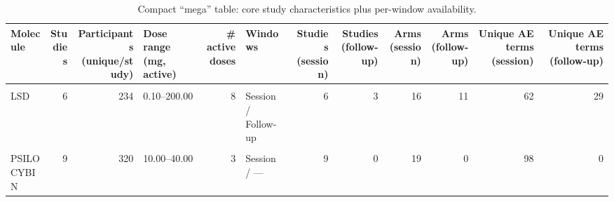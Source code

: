 \begin{table}[!h]
\centering
\caption{\label{tab:tab:mega_study_profile}Compact “mega” table: core study characteristics plus per-window availability.}
\centering
\begin{tabular}[t]{lrrlrlrrrrrr}
\toprule
Molecule & Studies & Participants (unique/study) & Dose range (mg, active) & \# active doses & Windows & Studies (session) & Studies (follow-up) & Arms (session) & Arms (follow-up) & Unique AE terms (session) & Unique AE terms (follow-up)\\
\midrule
\cellcolor{gray!10}{AYAHUASCA} & \cellcolor{gray!10}{2} & \cellcolor{gray!10}{24} & \cellcolor{gray!10}{0.36–0.36} & \cellcolor{gray!10}{1} & \cellcolor{gray!10}{Session / —} & \cellcolor{gray!10}{2} & \cellcolor{gray!10}{0} & \cellcolor{gray!10}{4} & \cellcolor{gray!10}{0} & \cellcolor{gray!10}{12} & \cellcolor{gray!10}{0}\\
LSD & 6 & 234 & 0.10–200.00 & 8 & Session / Follow-up & 6 & 3 & 16 & 11 & 62 & 29\\
\cellcolor{gray!10}{MDMA} & \cellcolor{gray!10}{10} & \cellcolor{gray!10}{215} & \cellcolor{gray!10}{75.00–150.00} & \cellcolor{gray!10}{5} & \cellcolor{gray!10}{Session / Follow-up} & \cellcolor{gray!10}{10} & \cellcolor{gray!10}{3} & \cellcolor{gray!10}{23} & \cellcolor{gray!10}{7} & \cellcolor{gray!10}{70} & \cellcolor{gray!10}{22}\\
PSILOCYBIN & 9 & 320 & 10.00–40.00 & 3 & Session / — & 9 & 0 & 19 & 0 & 98 & 0\\
\bottomrule
\end{tabular}
\end{table}

